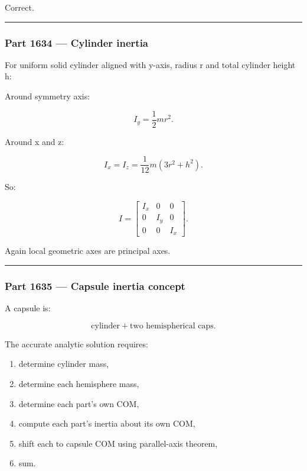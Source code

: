 Correct.

\begin{center}\rule{0.5\linewidth}{0.5pt}\end{center}

\subsubsection{Part 1634 --- Cylinder inertia}\label{part-1634-cylinder-inertia}

For uniform solid cylinder aligned with y-axis, radius r and total cylinder height h:

Around symmetry axis:

\[
\boxed{
I_y
=
\frac12mr^2.
}
\]

Around x and z:

\[
\boxed{
I_x=I_z
=
\frac{1}{12}
m(3r^2+h^2).
}
\]

So:

\[
I=
\begin{bmatrix}
I_x&0&0\\
0&I_y&0\\
0&0&I_x
\end{bmatrix}.
\]

Again local geometric axes are principal axes.

\begin{center}\rule{0.5\linewidth}{0.5pt}\end{center}

\subsubsection{Part 1635 --- Capsule inertia concept}\label{part-1635-capsule-inertia-concept}

A capsule is:

\[
\text{cylinder}
+
\text{two hemispherical caps}.
\]

The accurate analytic solution requires:

\begin{enumerate}
\def\labelenumi{\arabic{enumi}.}
\tightlist
\item
  determine cylinder mass,
\item
  determine each hemisphere mass,
\item
  determine each part's own COM,
\item
  compute each part's inertia about its own COM,
\item
  shift each to capsule COM using parallel-axis theorem,
\item
  sum.
\end{enumerate}

